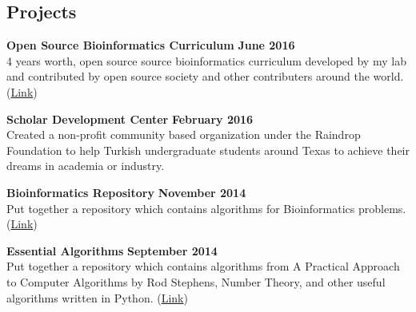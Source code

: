 \documentclass[margin,line]{res}
\begin{document}
\begin{resume}
%

%



\section{\sc Projects}


{\bf Open Source Bioinformatics Curriculum} \hfill {\bf June  2016}\\
4 years worth, open source source bioinformatics curriculum developed by my lab and contributed by open source society and other contributers around the world. (\href{https://github.com/open-source-society/bioinformatics}{Link})

{\bf Scholar Development Center} \hfill {\bf February  2016}\\
Created a non-profit community based organization under the Raindrop Foundation to help Turkish undergraduate students around Texas to achieve their dreams in academia or industry. 

{\bf Bioinformatics Repository} \hfill {\bf November 2014}\\
Put together a repository which contains algorithms for Bioinformatics problems. (\href{https://github.com/eneskemalergin/Bioinformatics_101}{Link})

{\bf Essential Algorithms} \hfill {\bf September 2014}\\
Put together a repository which contains algorithms from A Practical Approach to Computer Algorithms by Rod Stephens, Number Theory, and other useful algorithms written in Python. (\href{https://github.com/eneskemalergin/Essential_Algorithms}{Link})



\end{resume}
\end{document}
